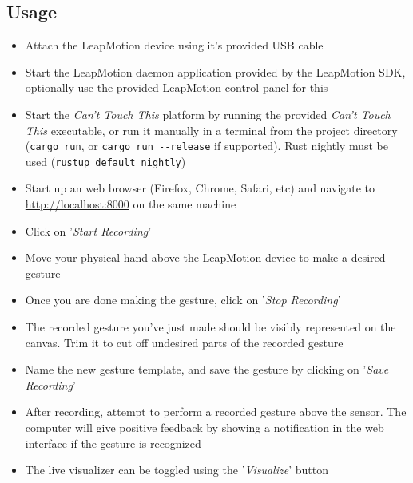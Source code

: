 \documentclass{standalone}
\begin{document}
  \subsection{Usage}
  \begin{itemize}
    \tightlist{}
    \item Attach the LeapMotion device using it's provided USB cable
    \item Start the LeapMotion daemon application provided by the LeapMotion
      SDK, optionally use the provided LeapMotion control panel for this
    \item Start the \textit{Can't Touch This} platform by running the provided
      \emph{Can't Touch This} executable, or run it manually in a terminal from
      the project directory (\verb_cargo run_, or \verb_cargo run --release_ if
      supported). Rust nightly must be used (\verb_rustup default nightly_)
    \item Start up an web browser (Firefox, Chrome, Safari, etc) and navigate to
      \url{http://localhost:8000} on the same machine
    \item Click on '\textit{Start Recording}'
    \item Move your physical hand above the LeapMotion device to make a desired
      gesture
    \item Once you are done making the gesture, click on
      '\textit{Stop Recording}'
    \item The recorded gesture you've just made should be visibly represented on
      the canvas. Trim it to cut off undesired parts of the recorded gesture
    \item Name the new gesture template, and save the gesture by clicking on '\textit{Save Recording}'
    \item After recording, attempt to perform a recorded gesture above the
      sensor. The computer will give positive feedback by showing a notification
      in the web interface if the gesture is recognized
    \item The live visualizer can be toggled using the '\textit{Visualize}'
      button
  \end{itemize}

  \clearpage
\end{document}
